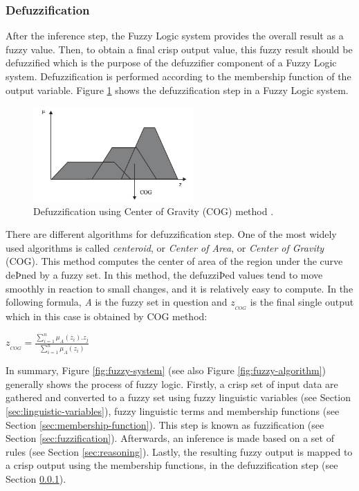 \documentclass[11pt]{article}
\begin{document}
\subsubsection{Defuzzification}
\label{sec:defuzzification}

After the inference step, the Fuzzy Logic system provides the overall result as
a fuzzy value. Then, to obtain a final crisp output value, this fuzzy result
should be defuzzified which is the purpose of the defuzzifier component of a
Fuzzy Logic system. Defuzzification is performed according to the membership
function of the output variable. Figure \ref{fig:defuzzification} shows the
defuzzification step in a Fuzzy Logic system.

\begin{figure}[tbh]
  \center
  \includegraphics[width=0.55\textwidth]{figure/cog.png}
  \caption{Defuzzification using Center of Gravity (COG) method
  \cite{antonio:cog-defuzzification}.}
  \label{fig:defuzzification}
\end{figure}

There are different algorithms for defuzzification step. One of the most
widely used algorithms is called \textit{centeroid}, or \textit{Center of
Area}, or \textit{Center of Gravity} (COG). This method computes the center of
area of the region under the curve deÞned by a fuzzy set. In this method, the
defuzziÞed values tend to move smoothly in reaction to small changes, and it is
relatively easy to compute. In the following formula, \textit{A} is the fuzzy
set in question and $z_{_{COG}}$ is the final single output which in this case
is obtained by COG method:\\

\begin{center}
$z_{_{COG}} = \frac{\sum\limits_{i=1}^{n} \mu_A(z_i).z_j}{\sum\limits_{i=1}^{n}
\mu_A(z_i)}$
\end{center}

In summary, Figure \ref{fig:fuzzy-system} (see also Figure
\ref{fig:fuzzy-algorithm}) generally shows the process of fuzzy logic. Firstly,
a crisp set of input data are gathered and converted to a fuzzy set using fuzzy
linguistic variables (see Section \ref{sec:linguistic-variables}), fuzzy
linguistic terms and membership functions (see Section
\ref{sec:membership-function}). This step is known as fuzzification (see
Section \ref{sec:fuzzification}). Afterwards, an inference is made based on a
set of rules (see Section \ref{sec:reasoning}). Lastly, the resulting fuzzy
output is mapped to a crisp output using the membership functions, in the
defuzzification step (see Section \ref{sec:defuzzification}).
\end{document}
